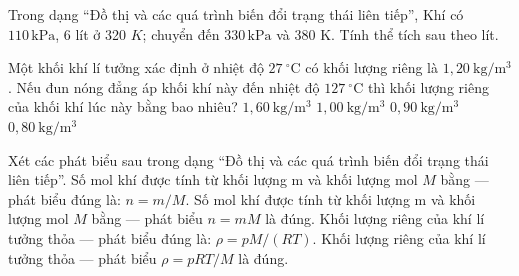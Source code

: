 \begin{ex}
Trong dạng “Đồ thị và các quá trình biến đổi trạng thái liên tiếp”, Khí có $110\,\text{kPa}$, 6 lít ở 320 $K$; chuyển đến $330\,\text{kPa}$ và 380 K. Tính thể tích sau theo lít.
\end{ex}

\begin{ex}
Một khối khí lí tưởng xác định ở nhiệt độ $27\ ^\circ\mathrm{C}$ có khối lượng riêng là $1,20\ \mathrm{kg/m^3}$. Nếu đun nóng đẳng áp khối khí này đến nhiệt độ $127\ ^\circ\mathrm{C}$ thì khối lượng riêng của khối khí lúc này bằng bao nhiêu?
\choice
{$1,60\ \mathrm{kg/m^3}$}
{$1,00\ \mathrm{kg/m^3}$}
{\True $0,90\ \mathrm{kg/m^3}$}
{$0,80\ \mathrm{kg/m^3}$}
\end{ex}

\begin{ex}
Xét các phát biểu sau trong dạng “Đồ thị và các quá trình biến đổi trạng thái liên tiếp”.
\choiceTF
{\True Số mol khí được tính từ khối lượng m và khối lượng mol $M$ bằng — phát biểu đúng là: $n=m/M$.}
{Số mol khí được tính từ khối lượng m và khối lượng mol $M$ bằng — phát biểu $n=mM$ là đúng.}
{\True Khối lượng riêng của khí lí tưởng thỏa — phát biểu đúng là: $\rho=pM/(RT)$.}
{Khối lượng riêng của khí lí tưởng thỏa — phát biểu $\rho=pRT/M$ là đúng.}
\end{ex}


